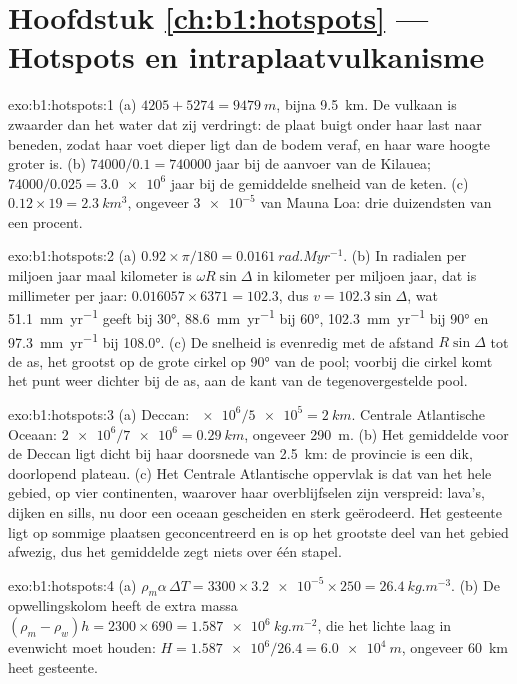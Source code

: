 \section*{Hoofdstuk \ref{ch:b1:hotspots} --- Hotspots en intraplaatvulkanisme}

\begin{solution}{exo:b1:hotspots:1}
(a) $4205 + 5274 = \qty{9479}{m}$, bijna \qty{9.5}{km}. De vulkaan is
zwaarder dan het water dat zij verdringt: de plaat buigt onder haar last naar beneden, zodat
haar voet dieper ligt dan de bodem veraf, en haar ware hoogte groter is.
(b) $74000/0.1 = \num{740000}$ jaar bij de aanvoer van de Kilauea;
$74000/0.025 = \num{3.0e6}$ jaar bij de gemiddelde snelheid van de keten. (c)
$0.12\times19 = \qty{2.3}{km^3}$, ongeveer $\num{3e-5}$ van Mauna Loa: drie
duizendsten van een procent.
\end{solution}

\begin{solution}{exo:b1:hotspots:2}
(a) $0.92\times\pi/180 = \qty{0.0161}{rad.Myr^{-1}}$. (b) In radialen per
miljoen jaar maal kilometer is $\omega R\sin\Delta$ in kilometer per
miljoen jaar, dat is millimeter per jaar: $0.016057\times6371 = 102.3$, dus
$v = 102.3\sin\Delta$, wat \qty{51.1}{mm.yr^{-1}} geeft bij \ang{30},
\qty{88.6}{mm.yr^{-1}} bij \ang{60}, \qty{102.3}{mm.yr^{-1}} bij \ang{90} en
\qty{97.3}{mm.yr^{-1}} bij \ang{108.0}. (c) De snelheid is evenredig met de
afstand $R\sin\Delta$ tot de as, het grootst op de grote cirkel op \ang{90}
van de pool; voorbij die cirkel komt het punt weer dichter bij de as, aan de
kant van de tegenovergestelde pool.
\end{solution}

\begin{solution}{exo:b1:hotspots:3}
(a) Deccan: $\num{e6}/\num{5e5} = \qty{2}{km}$. Centrale Atlantische Oceaan:
$\num{2e6}/\num{7e6} = \qty{0.29}{km}$, ongeveer \qty{290}{m}. (b) Het gemiddelde voor
de Deccan ligt dicht bij haar doorsnede van \qty{2.5}{km}: de provincie is een dik,
doorlopend plateau. (c) Het Centrale Atlantische oppervlak is dat van het hele gebied,
op vier continenten, waarover haar overblijfselen zijn verspreid: lava's, dijken en
sills, nu door een oceaan gescheiden en sterk geërodeerd. Het gesteente ligt op sommige
plaatsen geconcentreerd en is op het grootste deel van het gebied afwezig, dus het gemiddelde
zegt niets over één stapel.
\end{solution}

\begin{solution}{exo:b1:hotspots:4}
(a) $\rho_m\alpha\,\Delta T = 3300\times\num{3.2e-5}\times250 =
\qty{26.4}{kg.m^{-3}}$. (b) De opwellingskolom heeft de extra massa
$(\rho_m - \rho_w)h = 2300\times690 = \qty{1.587e6}{kg.m^{-2}}$, die het lichte
laag in evenwicht moet houden: $H = \num{1.587e6}/26.4 = \qty{6.0e4}{m}$, ongeveer
\qty{60}{km} heet gesteente.
\end{solution}

